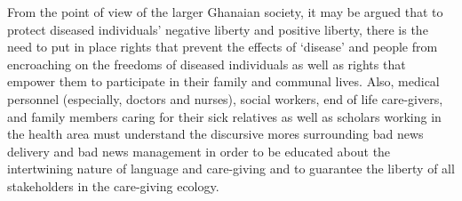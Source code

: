 \documentclass[output=paper,colorlinks,citecolor=brown]{langscibook}
\begin{document}
From the point of view of the larger Ghanaian society, it may be argued that to protect diseased individuals’ negative liberty and positive liberty, there is the need to put in place rights that prevent the effects of ‘disease’ and people from encroaching on the freedoms of diseased individuals as well as rights that empower them to participate in their family and communal lives. Also, medical personnel (especially, doctors and nurses), social workers, end of life care-givers, and family members caring for their sick relatives as well as scholars working in the health area must understand the discursive mores surrounding bad news delivery and bad news management in order to be educated about the intertwining nature of language and care-giving and to guarantee the liberty of all stakeholders in the care-giving ecology.


{\sloppy\printbibliography[heading=subbibliography,notkeyword=this]}
\end{document}
